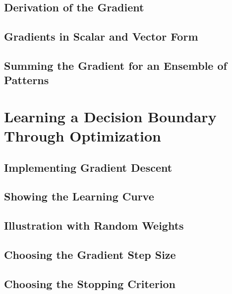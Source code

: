 \documentclass[letterpaper]{article}
\begin{document}
\subsection{Derivation of the Gradient}
\subsection{Gradients in Scalar and Vector Form}
\subsection{Summing the Gradient for an Ensemble of Patterns}

\section{Learning a Decision Boundary Through Optimization}

\subsection{Implementing Gradient Descent}
\subsection{Showing the Learning Curve}
\subsection{Illustration with Random Weights}
\subsection{Choosing the Gradient Step Size}
\subsection{Choosing the Stopping Criterion}
\end{document}

